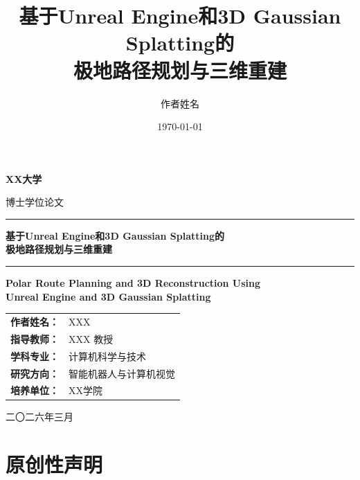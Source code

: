 \documentclass[12pt,a4paper]{ctexbook}
\title{\textbf{基于Unreal Engine和3D Gaussian Splatting的\\极地路径规划与三维重建}}
\author{作者姓名}
\date{\today}
\begin{document}
\begin{titlepage}
    \centering
    \vspace*{1cm}

    {\LARGE\bfseries XX大学}

    \vspace{0.5cm}

    {\Large 博士学位论文}

    \vspace{2cm}

    \rule{\textwidth}{1.5pt}

    \vspace{0.8cm}

    {\Huge\bfseries 基于Unreal Engine和3D Gaussian Splatting的\\[0.6em]极地路径规划与三维重建}

    \vspace{0.8cm}

    \rule{\textwidth}{1.5pt}

    \vspace{1.5cm}

    {\Large\bfseries Polar Route Planning and 3D Reconstruction Using \\[0.4em]Unreal Engine and 3D Gaussian Splatting}

    \vspace{3cm}

    \begin{tabular}{rl}
        \textbf{作者姓名：} & XXX \\[1.2em]
        \textbf{指导教师：} & XXX 教授 \\[1.2em]
        \textbf{学科专业：} & 计算机科学与技术 \\[1.2em]
        \textbf{研究方向：} & 智能机器人与计算机视觉 \\[1.2em]
        \textbf{培养单位：} & XX学院 \\[1.2em]
    \end{tabular}

    \vfill

    {\large 二〇二六年三月}

\end{titlepage}

\chapter*{原创性声明}
\end{document}
